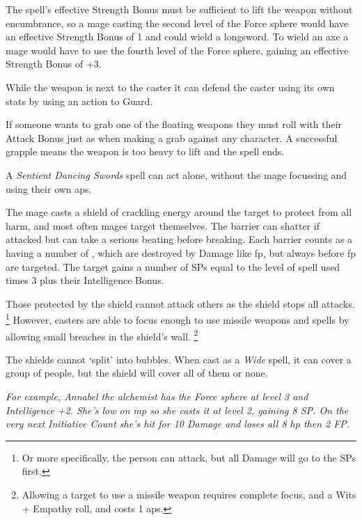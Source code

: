 \begin{multicols}{2}
The spell's effective Strength Bonus must be sufficient to lift the weapon without encumbrance, so a mage casting the second level of the Force sphere would have an effective Strength Bonus of 1 and could wield a longsword.
To wield an axe a mage would have to use the fourth level of the Force sphere, gaining an effective Strength Bonus of +3.

While the weapon is next to the caster it can defend the caster using its own stats by using an action to Guard.

If someone wants to grab one of the floating weapons they must roll with their Attack Bonus just as when making a grab against any character.
A successful grapple means the weapon is too heavy to lift and the spell ends.

A \textit{Sentient Dancing Swords} spell can act alone, without the mage focussing and using their own \glspl{ap}.


The mage casts a shield of crackling energy around the target to protect from all harm, and most often mages target themselves.
The barrier can shatter if attacked but can take a serious beating before breaking.
Each barrier counts as a having a number of , which are destroyed by Damage like \gls{fp}, but always before \gls{fp} are targeted.
The target gains a number of \glspl{SP} equal to the level of spell used times 3 plus their Intelligence Bonus.

Those protected by the shield cannot attack others as the shield stops all attacks.%
\footnote{Or more specifically, the person can attack, but all Damage will go to the \glspl{SP} first.}
However, casters are able to focus enough to use missile weapons and spells by allowing small breaches in the shield's wall.
\footnote{Allowing a target to use a missile weapon requires complete focus, and a Wits + Empathy roll, and costs 1 \glspl{ap}.}

The shields cannot `split' into bubbles.
When cast as a \textit{Wide} spell, it can cover a group of people, but the shield will cover all of them or none.

\textit{For example, Annabel the alchemist has the Force sphere at level 3 and Intelligence +2.
She's low on \gls{mp} so she casts it at level 2, gaining 8 \gls{SP}.
On the very next Initiative Count she's hit for 10 Damage and loses all 8 \gls{hp} then 2 FP.}


\end{multicols}
